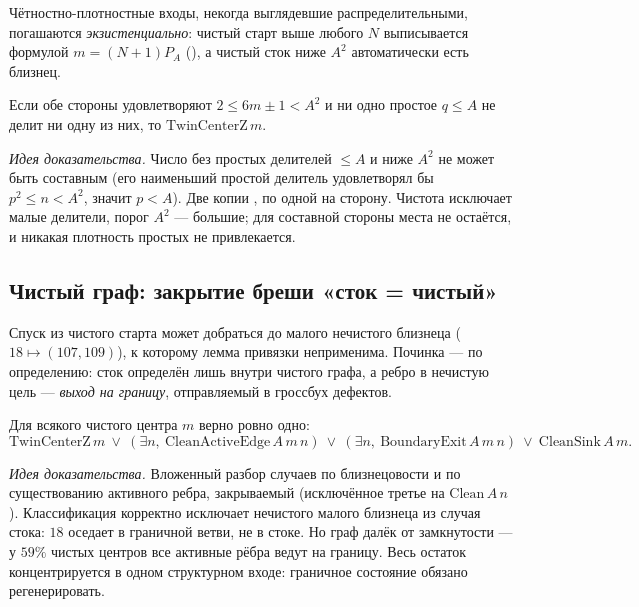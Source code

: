 Чётностно-плотностные входы, некогда выглядевшие распределительными, погашаются
\emph{экзистенциально}: чистый старт выше любого $N$ выписывается формулой $m=(N+1)P_A$
(), а чистый сток ниже $A^2$ автоматически есть близнец.

\begin{theorem}\label{thm:sink_is_twin}
Если обе стороны удовлетворяют $2\le 6m\pm1<A^2$ и ни одно простое $q\le A$ не делит ни одну из них,
то $\mathrm{TwinCenterZ}\,m$.
\end{theorem}

\emph{Идея доказательства.} Число без простых делителей $\le A$ и ниже $A^2$ не может быть составным
(его наименьший простой делитель удовлетворял бы $p^2\le n<A^2$, значит $p<A$). Две копии
, по одной на сторону. \green{} Чистота исключает малые делители,
порог $A^2$ --- большие; для составной стороны места не остаётся, и никакая плотность простых не
привлекается.

\subsection{Чистый граф: закрытие бреши «сток = чистый»}

Спуск из чистого старта может добраться до малого нечистого близнеца ($18\mapsto(107,109)$), к
которому лемма привязки неприменима. Починка --- по определению: сток определён лишь внутри чистого
графа, а ребро в нечистую цель --- \emph{выход на границу}, отправляемый в гроссбух дефектов.

\begin{theorem}\label{thm:clean_center_outcome}
Для всякого чистого центра $m$ верно ровно одно:
\[
  \mathrm{TwinCenterZ}\,m\ \lor\ (\exists n,\ \mathrm{CleanActiveEdge}\,A\,m\,n)\ \lor\
  (\exists n,\ \mathrm{BoundaryExit}\,A\,m\,n)\ \lor\ \mathrm{CleanSink}\,A\,m.
\]
\end{theorem}

\emph{Идея доказательства.} Вложенный разбор случаев по близнецовости и по существованию активного
ребра, закрываемый \code{active\_edge\_clean\_or\_boundary} (исключённое третье на
$\mathrm{Clean}\,A\,n$). \green{} Классификация корректно исключает нечистого малого близнеца из
случая стока: $18$ оседает в граничной ветви, не в стоке. Но граф далёк от замкнутости --- у $59\%$
чистых центров все активные рёбра ведут на границу. Весь остаток концентрируется в одном \red{}
структурном входе: граничное состояние обязано регенерировать.

